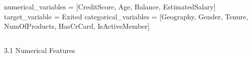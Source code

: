 \documentclass[
  letterpaper,
  DIV=11,
  numbers=noendperiod]{scrartcl}
\newenvironment{Shaded}{\begin{snugshade}}{\end{snugshade}}
\newcommand{\NormalTok}[1]{\textcolor[rgb]{0.00,0.23,0.31}{#1}}
\newcommand{\OperatorTok}[1]{\textcolor[rgb]{0.37,0.37,0.37}{#1}}
\newcommand{\StringTok}[1]{\textcolor[rgb]{0.13,0.47,0.30}{#1}}
\begin{document}
\begin{Shaded}
\begin{Highlighting}[]
\NormalTok{numerical\_variables }\OperatorTok{=}\NormalTok{ [}\StringTok{\textquotesingle{}CreditScore\textquotesingle{}}\NormalTok{, }\StringTok{\textquotesingle{}Age\textquotesingle{}}\NormalTok{, }\StringTok{\textquotesingle{}Balance\textquotesingle{}}\NormalTok{, }\StringTok{\textquotesingle{}EstimatedSalary\textquotesingle{}}\NormalTok{]}
\NormalTok{target\_variable }\OperatorTok{=} \StringTok{\textquotesingle{}Exited\textquotesingle{}}
\NormalTok{categorical\_variables }\OperatorTok{=}\NormalTok{ [}\StringTok{\textquotesingle{}Geography\textquotesingle{}}\NormalTok{, }\StringTok{\textquotesingle{}Gender\textquotesingle{}}\NormalTok{, }\StringTok{\textquotesingle{}Tenure\textquotesingle{}}\NormalTok{, }\StringTok{\textquotesingle{}NumOfProducts\textquotesingle{}}\NormalTok{, }\StringTok{\textquotesingle{}HasCrCard\textquotesingle{}}\NormalTok{, }\StringTok{\textquotesingle{}IsActiveMember\textquotesingle{}}\NormalTok{]}
\end{Highlighting}
\end{Shaded}

\hypertarget{section-5}{%
\subsection{}\label{section-5}}

3.1 Numerical Features
\end{document}
